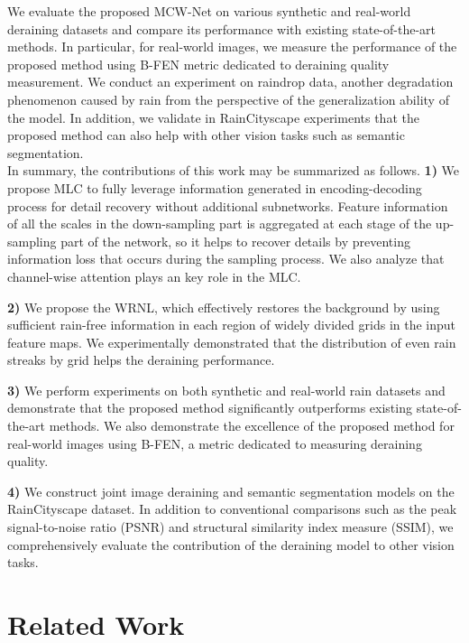 \documentclass[a4paper,fleqn]{cas-dc}
\begin{document}
We evaluate the proposed MCW-Net on various synthetic and real-world deraining datasets and compare its performance with existing state-of-the-art methods. 
In particular, for real-world images, we measure the performance of the proposed method using B-FEN \cite{wu2020subjective} metric dedicated to deraining quality measurement. We conduct an experiment on raindrop data, another degradation phenomenon caused by rain from the perspective of the generalization ability of the model. In addition, we validate in RainCityscape experiments that the proposed method can also help with other vision tasks such as semantic segmentation.
\\ 
In summary, the contributions of this work may be summarized as follows.
\noindent  \textbf{1)}
We propose MLC to fully leverage information generated in encoding-decoding process for detail recovery without additional subnetworks. Feature information of all the scales in the down-sampling part is aggregated at each stage of the up-sampling part of the network, so it helps to recover details by preventing information loss that occurs during the sampling process. We also analyze that channel-wise attention plays an key role in the MLC.

\textbf{2)}
We propose the WRNL, which effectively restores the background by using sufficient rain-free information in each region of widely divided grids in the input feature maps. We experimentally demonstrated that the distribution of even rain streaks by grid helps the deraining performance.

\textbf{3)}
We perform experiments on both synthetic and real-world rain datasets and demonstrate that the proposed method significantly outperforms existing state-of-the-art methods. We also demonstrate the excellence of the proposed method for real-world images using B-FEN, a metric dedicated to measuring deraining quality.

\textbf{4)}
We construct joint image deraining and semantic segmentation models on the RainCityscape dataset. In addition to conventional comparisons such as the peak signal-to-noise ratio (PSNR) and structural similarity index measure (SSIM), we comprehensively evaluate the contribution of the deraining model to other vision tasks.


\section{Related Work}
\end{document}

